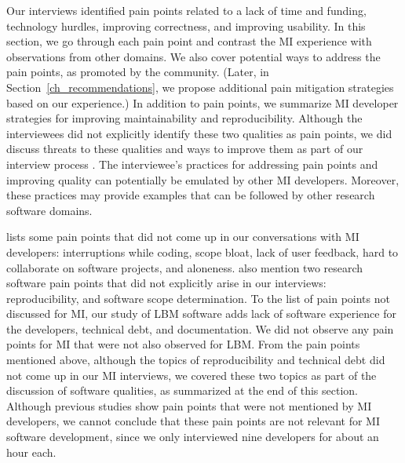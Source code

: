 \documentclass[final, 12pt, 3p, times]{elsarticle}
\begin{document}
Our interviews identified pain points related to a lack of time and funding,
technology hurdles, improving correctness, and improving usability.  In this
section, we go through each pain point and contrast the MI experience with
observations from other domains.  We also cover potential ways to address the
pain points, as promoted by the community.  (Later, in
Section~\ref{ch_recommendations}, we propose additional pain mitigation
strategies based on our experience.)  In addition to pain points, we summarize
MI developer strategies for improving maintainability and reproducibility.
Although the interviewees did not explicitly identify these two qualities as
pain points, we did discuss threats to these qualities and ways to improve them
as part of our interview process \cite{SmithEtAl2021}.  The interviewee's
practices for addressing pain points and improving quality can potentially be
emulated by other MI developers. Moreover, these practices may provide examples
that can be followed by other research software domains.

\cite{PintoEtAl2018} lists some pain points that did not come up in our
conversations with MI developers: interruptions while coding, scope bloat, lack
of user feedback, hard to collaborate on software projects, and aloneness.
\cite{WieseEtAl2019} also mention two research software pain points that did
not explicitly arise in our interviews: reproducibility, and software scope
determination.  To the list of pain points not discussed for MI, our study of
LBM software \cite{SmithEtAl2024} adds lack of software experience for the
developers, technical debt, and documentation. We did not observe any pain
points for MI that were not also observed for LBM. From the pain points
mentioned above, although the topics of reproducibility and technical debt did
not come up in our MI interviews, we covered these two topics as part of the
discussion of software qualities, as summarized at the end of this section.
Although previous studies show pain points that were not mentioned by MI
developers, we cannot conclude that these pain points are not relevant for MI
software development, since we only interviewed nine developers for about an
hour each.
\end{document}
